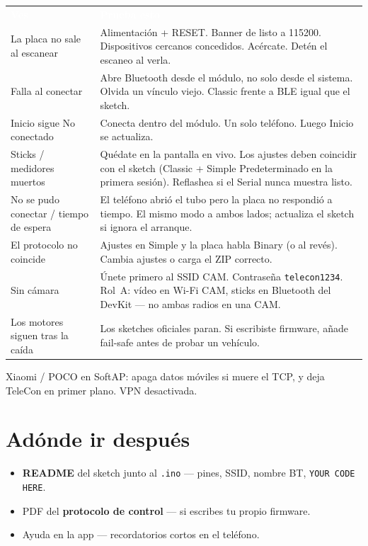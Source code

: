 \documentclass[12pt,a4paper]{article}
\newcommand{\thc}[1]{\textcolor{white}{\bfseries #1}}
\begin{document}
\begin{center}
\renewcommand{\arraystretch}{1.2}
\begin{tabular}{>{\raggedright\arraybackslash}p{3.7cm}
                >{\raggedright\arraybackslash}p{8.5cm}}
\rowcolor{TblHead}
\thc{Ves} & \thc{Prueba esto} \\
La placa no sale al escanear &
  Alimentación + RESET. Banner de listo a 115200.
  Dispositivos cercanos concedidos. Acércate. Detén el escaneo al verla. \\
\rowcolor{TblTelem}
Falla al conectar &
  Abre Bluetooth desde el módulo, no solo desde el sistema.
  Olvida un vínculo viejo. Classic frente a BLE igual que el sketch. \\
Inicio sigue No conectado &
  Conecta dentro del módulo. Un solo teléfono. Luego Inicio se actualiza. \\
\rowcolor{TblSw}
Sticks / medidores muertos &
  Quédate en la pantalla en vivo. Los ajustes deben coincidir con el
  sketch (Classic + Simple Predeterminado en la primera sesión).
  Reflashea si el Serial nunca muestra listo. \\
No se pudo conectar /
  tiempo de espera &
  El teléfono abrió el tubo pero la placa no respondió a tiempo.
  El mismo modo a ambos lados; actualiza el sketch si ignora el arranque. \\
\rowcolor{TblId}
El protocolo no coincide &
  Ajustes en Simple y la placa habla Binary (o al revés).
  Cambia ajustes o carga el ZIP correcto. \\
Sin cámara &
  Únete primero al SSID CAM. Contraseña \texttt{telecon1234}.
  Rol~A: vídeo en Wi-Fi CAM, sticks en Bluetooth del DevKit --- no ambas
  radios en una CAM. \\
\rowcolor{TblSum}
Los motores siguen
  tras la caída &
  Los sketches oficiales paran. Si escribiste firmware, añade fail-safe
  antes de probar un vehículo. \\
\end{tabular}
\end{center}

Xiaomi / POCO en SoftAP: apaga datos móviles si muere el TCP, y deja
TeleCon en primer plano. VPN desactivada.

\section{Adónde ir después}
\label{sec:next}

\begin{itemize}[leftmargin=1.4cm]
  \item \textbf{README} del sketch junto al \texttt{.ino} --- pines, SSID,
        nombre BT, \texttt{YOUR CODE HERE}.
  \item PDF del \textbf{protocolo de control} --- si escribes tu propio firmware.
  \item Ayuda en la app --- recordatorios cortos en el teléfono.
\end{itemize}
\end{document}
